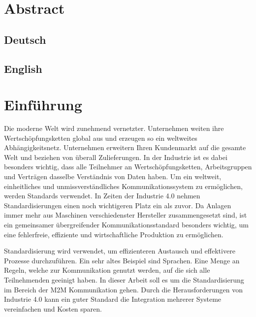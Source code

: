 \documentclass[a4paper, 12pt, oneside]{scrbook}
\begin{document}
	\frontmatter
	
	
	\tableofcontents
	\listoffigures
	\listoftables
	\nocite{*}

	
	
	\chapter*{Abstract}
	
	\section*{Deutsch}
	
	\section*{English}
	
	
	\mainmatter
	\pagebreak
	\chapter{Einführung}\label{ch:Einführung}
	
	Die moderne Welt wird zunehmend vernetzter. Unternehmen weiten ihre Wertschöpfungsketten global aus und erzeugen so ein weltweites Abhängigkeitsnetz. Unternehmen erweitern Ihren Kundenmarkt auf die gesamte Welt und beziehen von überall Zulieferungen. In der Industrie ist es dabei besonders wichtig, dass alle Teilnehmer an Wertschöpfungsketten, Arbeitsgruppen und Verträgen dasselbe Verständnis von Daten haben. Um ein weltweit, einheitliches und unmissverständliches Kommunikationssystem zu ermöglichen, werden Standards verwendet. In Zeiten der Industrie 4.0 nehmen Standardisierungen einen noch wichtigeren Platz ein als zuvor. Da Anlagen immer mehr aus Maschinen verschiedenster Hersteller zusammengesetzt sind, ist ein gemeinsamer übergreifender Kommunikationsstandard besonders wichtig, um eine fehlerfreie, effiziente und wirtschaftliche Produktion zu ermöglichen.
	
	Standardisierung wird verwendet, um effizienteren Austausch und effektivere Prozesse durchzuführen. Ein sehr altes Beispiel sind Sprachen. Eine Menge an Regeln, welche zur Kommunikation genutzt werden, auf die sich alle Teilnehmenden geeinigt haben. In dieser Arbeit soll es um die Standardisierung im Bereich der \ac{M2M} Kommunikation gehen. Durch die Herausforderungen von Industrie 4.0 kann ein guter Standard die Integration mehrerer Systeme vereinfachen und Kosten sparen.
	
\end{document}

